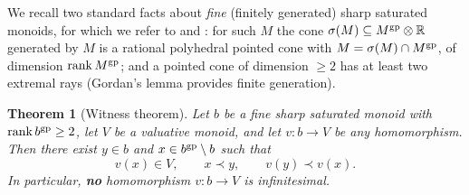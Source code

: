 \documentclass[11pt]{amsart}
\theoremstyle{plain}
\newtheorem{theorem}{Theorem}[section]
\theoremstyle{remark}
\theoremstyle{definition}
\numberwithin{equation}{section}
\begin{document}
We recall two standard facts about \emph{fine} (finitely generated) sharp
saturated monoids, for which we refer to \cite[\S I]{Ogus} and
\cite{Kat89}: for such $M$ the cone
$\sigma(M)\subseteq M^{\rm gp}\otimes\mathbb R$ generated by $M$ is a
rational polyhedral pointed cone with
$M=\sigma(M)\cap M^{\rm gp}$, of dimension $\operatorname{rank}M^{\rm gp}$;
and a pointed cone of dimension $\ge2$ has at least two extremal rays
(Gordan's lemma provides finite generation).

\begin{theorem}[Witness theorem]\label{thm:witness}
Let $b$ be a fine sharp saturated monoid with
$\operatorname{rank}b^{\rm gp}\ge 2$, let $V$ be a valuative monoid, and let
$v\colon b\to V$ be any homomorphism.  Then there exist $y\in b$ and
$x\in b^{\rm gp}\setminus b$ such that
\[
v(x)\in V,\qquad x\prec y,\qquad v(y)\prec v(x).
\]
In particular, \textbf{no} homomorphism $v\colon b\to V$ is
infinitesimal.
\end{theorem}
\end{document}
